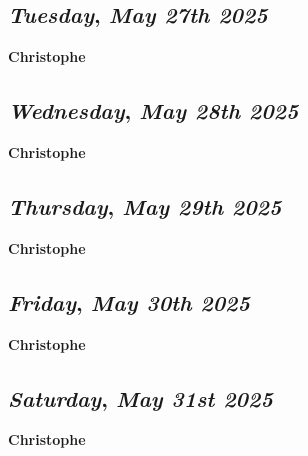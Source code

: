 \def\day{\textit{May 27th 2025}}
\def\weekday{\textit{Tuesday}}
\subsection*{\weekday, \day}
\textbf {Christophe}

\def\day{\textit{May 28th 2025}}
\def\weekday{\textit{Wednesday}}
\subsection*{\weekday, \day}
\textbf {Christophe}

\def\day{\textit{May 29th 2025}}
\def\weekday{\textit{Thursday}}
\subsection*{\weekday, \day}
\textbf {Christophe}

\def\day{\textit{May 30th 2025}}
\def\weekday{\textit{Friday}}
\subsection*{\weekday, \day}
\textbf {Christophe}

\def\day{\textit{May 31st 2025}}
\def\weekday{\textit{Saturday}}
\subsection*{\weekday, \day}
\textbf {Christophe}
